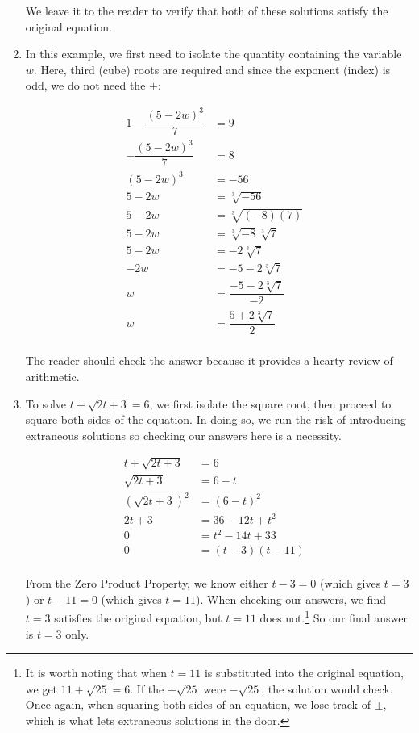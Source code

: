\begin{ex}
\begin{enumerate}
We leave it to the reader to verify that both of these solutions satisfy the original equation.
\item  In this example, we first need to isolate the quantity containing the variable $w$.  Here, third (cube) roots are required and since the exponent (index) is odd, we do not need the $\pm$:

\begin{align*}
1 - \dfrac{(5-2w)^3}{7} & =  9 & \\ 
- \dfrac{(5-2w)^3}{7} & = 8 \tag{Subtract $1$} \\
(5-2w) ^ 3 & = -56 \tag{Multiply by $-7$} \\
5 - 2w & = \sqrt[3]{-56} \tag{Extract cube root} \\
5 - 2w & = \sqrt[3]{(-8)(7)} & \\
5 - 2w & = \sqrt[3]{-8} \sqrt[3]{7} \tag{Product Rule}\\
5 - 2w & = -2\sqrt[3]{7} & \\
-2w & = -5-2 \sqrt[3]{7} \tag{Subtract $5$} \\
w & = \dfrac{-5 - 2\sqrt[3]{7}}{-2} \tag{Divide by $-2$} \\
w & = \dfrac{5 + 2\sqrt[3]{7}}{2} \tag{Properties of Negatives} \\
\end{align*}

The reader should check the answer because it provides a hearty review of arithmetic.

\item  To solve  $t + \sqrt{2t+3} = 6$, we first isolate the square root, then proceed to square both sides of the equation.  In doing so, we run the risk of introducing extraneous solutions so checking our answers here is a necessity.

\begin{align*}
t + \sqrt{2t+3}  & = 6 & \\ 
\sqrt{2t+3} & = 6 - t \tag{Subtract $t$} \\ 
(\sqrt{2t+3})^2 & = (6-t)^2 \tag{Square both sides} \\ 
2t + 3 & = 36-12t + t^2 \tag{F.O.I.L. / Perfect Square Trinomial} \\ 
0 & = t^2 - 14t + 33 \tag{Subtract $2t$ and $3$} \\ 
0 & = (t-3)(t-11) \tag{Factor} \\
\end{align*}

From the Zero Product Property, we know either $t - 3 = 0$ (which gives $t=3$) or $t-11 = 0$ (which gives $t=11$).  When checking our answers, we find $t = 3$ satisfies the original equation, but $t = 11$ does not.\footnote{It is worth noting that when $t=11$ is substituted into the original equation, we get $11 + \sqrt{25} = 6$.  If the $+\sqrt{25}$ were $-\sqrt{25}$, the solution would check. Once again, when squaring both sides of an equation, we lose track of $\pm$, which is what lets extraneous solutions in the door.}  So our final answer is $t = 3$ only.


\end{enumerate}
\end{ex}
